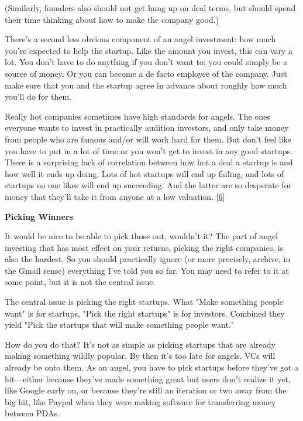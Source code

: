 (Similarly,
                  founders also should not get hung up on deal terms, but should
                  spend their time thinking about how to make the company
                  good.)

There's a second less obvious component of
                  an angel investment: how much you're expected to help the
                  startup. Like the amount you invest, this can vary a lot. You
                  don't have to do anything if you don't want to; you could
                  simply be a source of money. Or you can become a de facto
                  employee of the company. Just make sure that you and the
                  startup agree in advance about roughly how much you'll do for
                  them.

Really hot companies sometimes have high
                  standards for angels. The ones everyone wants to invest in
                  practically audition investors, and only take money from
                  people who are famous and/or will work hard for them. But
                  don't feel like you have to put in a lot of time or you won't
                  get to invest in any good startups. There is a surprising lack
                  of correlation between how hot a deal a startup is and how
                  well it ends up doing. Lots of hot startups will end up
                  failing, and lots of startups no one likes will end up
                  succeeding. And the latter are so desperate for money that
                  they'll take it from anyone at a low valuation.
                  [\href{\#f6n}{6}]

\textbf{Picking Winners}

It would be
                  nice to be able to pick those out, wouldn't it? The part of
                  angel investing that has most effect on your returns, picking
                  the right companies, is also the hardest. So you should
                  practically ignore (or more precisely, archive, in the Gmail
                  sense) everything I've told you so far. You may need to refer
                  to it at some point, but it is not the central issue.

The
                  central issue is picking the right startups. What "Make
                  something people want" is for startups, "Pick the right
                  startups" is for investors. Combined they yield "Pick the
                  startups that will make something people want."

How
                  do you do that? It's not as simple as picking startups that
                  are already making something wildly popular. By then it's too
                  late for angels. VCs will already be onto them. As an angel,
                  you have to pick startups before they've got a
                  hit---either because they've made something great but
                  users don't realize it yet, like Google early on, or because
                  they're still an iteration or two away from the big hit, like
                  Paypal when they were making software for transferring money
                  between PDAs.

